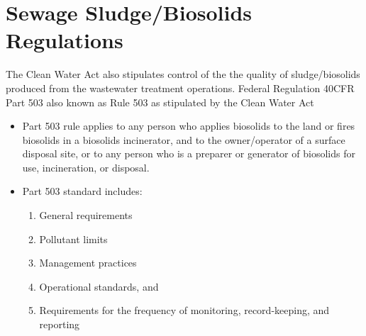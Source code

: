 \section{Sewage Sludge/Biosolids Regulations}
The Clean Water Act also stipulates control of the the quality of sludge/biosolids produced from the wastewater treatment operations.  Federal Regulation 40CFR Part 503 also known as Rule 503  as stipulated by the Clean Water Act 
			\begin{itemize}
				\item Part 503 rule applies to any person who applies biosolids to the land or fires biosolids in a biosolids incinerator, and to the owner/operator of a surface disposal site, or to any person who is a preparer or generator of biosolids for use, incineration, or disposal.
				\item Part 503 standard includes:
					\begin{enumerate}
						\item General requirements
						\item Pollutant limits
						\item Management practices
						\item Operational standards, and
						\item Requirements for the frequency of monitoring, record-keeping, and reporting
					\end{enumerate}
			\end{itemize}

